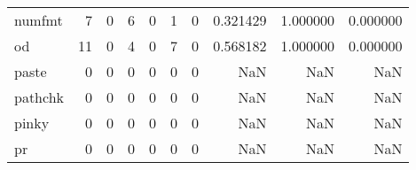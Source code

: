 \begin{tabular}{lrrrrrrrrr}
numfmt    &                                                  7 &                                                  0 &                                                  6 &                                                  0 &                                                  1 &                                                  0 &                                           0.321429 &                               1.000000 &                             0.000000 \\
od        &                                                 11 &                                                  0 &                                                  4 &                                                  0 &                                                  7 &                                                  0 &                                           0.568182 &                               1.000000 &                             0.000000 \\
paste     &                                                  0 &                                                  0 &                                                  0 &                                                  0 &                                                  0 &                                                  0 &                                                NaN &                                    NaN &                                  NaN \\
pathchk   &                                                  0 &                                                  0 &                                                  0 &                                                  0 &                                                  0 &                                                  0 &                                                NaN &                                    NaN &                                  NaN \\
pinky     &                                                  0 &                                                  0 &                                                  0 &                                                  0 &                                                  0 &                                                  0 &                                                NaN &                                    NaN &                                  NaN \\
pr        &                                                  0 &                                                  0 &                                                  0 &                                                  0 &                                                  0 &                                                  0 &                                                NaN &                                    NaN &                                  NaN \\

\end{tabular}
